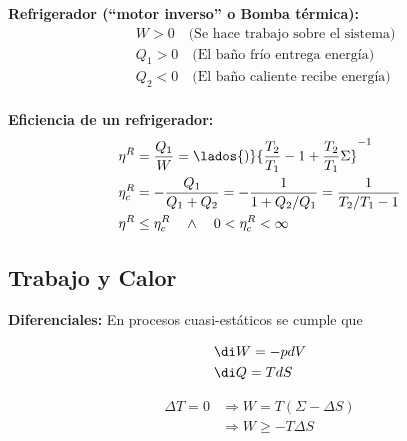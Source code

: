 \textbf{Refrigerador (``motor inverso'' o Bomba térmica):}
\begin{equation}
\begin{split}
    &W>0 \quad \text{(Se hace trabajo sobre el sistema)}\\
    &Q_1 >0 \quad \text{(El baño frío entrega energía)}\\
    &Q_2<0 \quad \text{(El baño caliente recibe energía)}\\
\end{split}
\nonumber
\end{equation}
\bigbreak

\textbf{Eficiencia de un refrigerador:} \txtsi{ }{(\ref{refri-q2-w})}
\begin{equation}
\begin{split}
    &\eta^R = \frac{Q_1}{W} = \lados{)}{\frac{T_2}{T_1} - 1 + \frac{T_2}{T_1}\Sigma}^{-1}\\
    &\eta^R_c=-\frac{Q_1}{Q_1+Q_2}=-\frac{1}{1+Q_2/Q_1}
    =\frac{1}{T_2/T_1-1}\\
    &\eta^R\leq\eta^R_c \quad \land \quad 0 < \eta^R_c < \infty\\
\end{split}
\nonumber
\end{equation}

\subsection{Trabajo y Calor}

\textbf{Diferenciales:} En procesos cuasi-estáticos se cumple que

\begin{equation}
\begin{split}
    &\di W = -pdV\\
    &\di Q = TdS\\
\end{split}
\nonumber
\end{equation}


\begin{equation}
\begin{split}
    \Delta T = 0 &\Rightarrow W = T(\Sigma-\Delta S)\\
    &\Rightarrow W\geq-T\Delta S\\
\end{split}
\nonumber
\end{equation}

